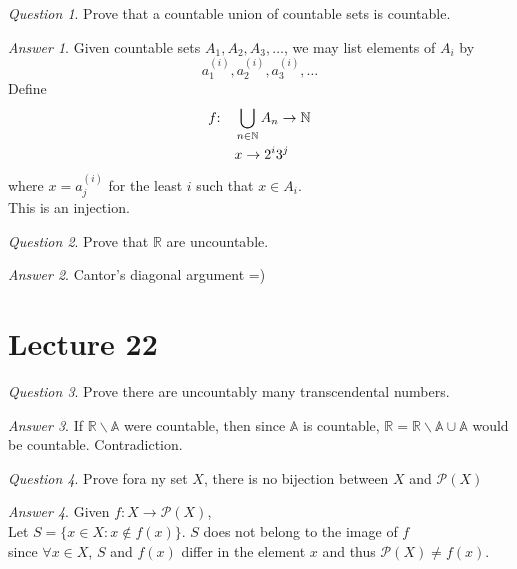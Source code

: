 \documentclass[]{article}
\def\naturals{\mathbb{N}}
\def\algebraics{\mathbb{A}}
\def\reals{\mathbb{R}}
\def\powerset{\mathcal{P}}
\theoremstyle{remark}
\theoremstyle{qnstyle}
\newtheorem{question}{Question}
\theoremstyle{answerstyle}
\newtheorem*{answer}{Answer}
\begin{document}
\begin{question}
    Prove that a countable union of countable sets is countable.
\end{question}
\begin{answer}
    Given countable sets $A_1, A_2, A_3, \ldots$, we may list elements of $A_i$ by 
        $$a_1^{(i)}, a_2^{(i)}, a_3^{(i)}, \ldots$$ 
    Define 
    \begin{align*}
        f \mkern-5mu: \quad &\bigcup_{n \in \naturals} A_n \to \naturals \\
                 &x \to 2^i 3^j
    \end{align*}
    where $x = a_j^{(i)}$ for the least $i$ such that $x \in A_i$. \\
    This is an injection.
\end{answer}

\begin{question}
    Prove that $\reals$ are uncountable.
\end{question}
\begin{answer}
    Cantor's diagonal argument =)
\end{answer}






\section* {Lecture 22}

\begin{question}
    Prove there are uncountably many transcendental numbers.
\end{question}
\begin{answer}
    If $\reals \backslash \algebraics$ were countable, then since $\algebraics$ is countable,
    $\reals = \reals \backslash \algebraics \cup \algebraics$ would be countable. Contradiction.
\end{answer}

\begin{question}
    Prove fora ny set $X$, there is no bijection between $X$ and $\powerset(X)$
\end{question}
\begin{answer}
    Given $f: X \to \powerset(X)$,\\
    Let $S = \{x \in X: x \not \in f(x) \}$. $S$ does not belong to the image of $f$\\
    since $\forall x \in X$, $S$ and $f(x)$ differ in the element $x$ and thus $\powerset(X) \not = f(x)$.
\end{answer}
\end{document}
